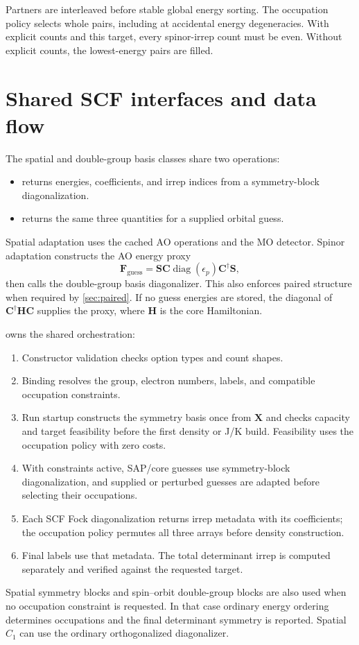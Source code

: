 \documentclass[aip,jcp,preprint,nobibnotes,nofootinbib]{revtex4-1}
\newcommand{\bvec}[1]{\mathbf{#1}}
\newcommand{\code}[1]{\texttt{\detokenize{#1}}}
\begin{document}
Partners are interleaved before stable global energy sorting. The occupation
policy selects whole pairs, including at accidental energy degeneracies.
With explicit counts and this target, every spinor-irrep count must be even.
Without explicit counts, the lowest-energy pairs are filled.

\section{Shared SCF interfaces and data flow}
\label{sec:implementation}

The spatial and double-group basis classes share two operations:
\begin{itemize}
 \item \code{eigh(F)} returns energies, coefficients, and irrep indices
       from a symmetry-block diagonalization.
 \item \code{adapt(C, eps)} returns the same three quantities for a supplied
       orbital guess.
\end{itemize}
Spatial adaptation uses the cached AO operations and the MO detector. Spinor
adaptation constructs the AO energy proxy
\begin{equation}
 \bvec{F}_{\mathrm{guess}}
 =\bvec{S}\bvec{C}\operatorname{diag}(\epsilon_p)
    \bvec{C}^\dagger\bvec{S},
 \label{eq:guess-proxy}
\end{equation}
then calls the double-group basis diagonalizer. This also enforces paired
structure when required by \cref{sec:paired}. If no guess energies are stored,
the diagonal of $\bvec{C}^\dagger\bvec{H}\bvec{C}$ supplies the proxy, where
$\bvec{H}$ is the core Hamiltonian.

\code{SCFBase} owns the shared orchestration:
\begin{enumerate}
 \item Constructor validation checks option types and count shapes.
 \item Binding resolves the group, electron numbers, labels, and compatible
       occupation constraints.
 \item Run startup constructs the symmetry basis once from $\bvec{X}$ and
       checks capacity and target feasibility before the first density or
       J/K build. Feasibility uses the occupation policy with zero costs.
 \item With constraints active, SAP/core guesses use symmetry-block
       diagonalization, and supplied or perturbed guesses are adapted before
       selecting their occupations.
 \item Each SCF Fock diagonalization returns irrep metadata with its
       coefficients; the occupation policy permutes all three arrays before
       density construction.
 \item Final labels use that metadata. The total determinant irrep is
       computed separately and verified against the requested target.
\end{enumerate}
Spatial symmetry blocks and spin--orbit double-group blocks are also used
when no occupation constraint is requested. In that case ordinary energy
ordering determines occupations and the final determinant symmetry is
reported. Spatial $C_1$ can use the ordinary orthogonalized diagonalizer.
\end{document}
